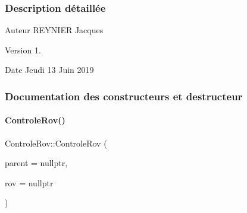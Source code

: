 \subsubsection{Description détaillée}
\begin{DoxyAuthor}{Auteur}
R\+E\+Y\+N\+I\+ER Jacques
\end{DoxyAuthor}
\begin{DoxyVersion}{Version}
1.
\end{DoxyVersion}
\begin{DoxyDate}{Date}
Jeudi 13 Juin 2019 
\end{DoxyDate}


\subsubsection{Documentation des constructeurs et destructeur}
\mbox{\label{class_controle_rov_acc4d5fea26770217df978d43df2ad51e}} 
\paragraph{\texorpdfstring{Controle\+Rov()}{ControleRov()}}
{\footnotesize\ttfamily Controle\+Rov\+::\+Controle\+Rov (\begin{DoxyParamCaption}\item[{Q\+Object $\ast$}]{parent = {\ttfamily nullptr},  }\item[{\hyperlink{class_rov}{Rov} $\ast$}]{rov = {\ttfamily nullptr} }\end{DoxyParamCaption})\hspace{0.3cm}{\ttfamily [explicit]}}



